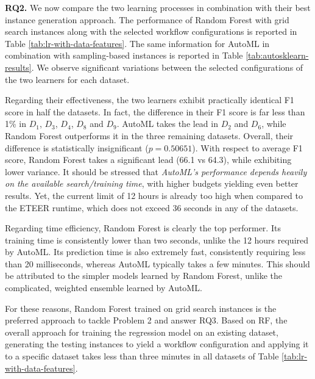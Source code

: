 %



%



\textbf{RQ2.} We now compare the two learning processes in combination with their best instance generation approach. The performance of Random Forest with grid search instances along with the selected workflow configurations 
is reported in Table \ref{tab:lr-with-data-features}. The same information for AutoML in combination with sampling-based instances is reported in Table \ref{tab:autosklearn-results}. We observe significant variations between the selected configurations of the two learners for each dataset.

Regarding their effectiveness, the two learners exhibit practically identical F1 score in half the datasets. In fact, the difference in their F1 score is far less than 1\% in $D_1$, $D_3$, $D_4$, $D_8$ and $D_9$. AutoML takes the lead in $D_2$ and $D_6$, while Random Forest outperforms it in the three remaining datasets. {Overall, their difference is statistically insignificant ($p = 0.50651$).} With respect to average F1 score, Random Forest takes a significant lead (66.1 vs 64.3), while exhibiting lower variance. It should be stressed that \textit{AutoML's performance depends heavily on the available search/training time}, with higher budgets yielding even better results. Yet, the current limit of 12 hours is already too high when compared to the ETEER runtime, which does not exceed 36 seconds in any of the datasets.

Regarding time efficiency, Random Forest is clearly the top performer. Its training time is consistently lower than two seconds, unlike the 12 hours required by AutoML. Its prediction time is also extremely fast, consistently requiring less than 20 milliseconds, whereas AutoML typically takes a few minutes. This should be attributed to the simpler models learned by Random Forest, unlike the complicated, weighted ensemble learned by AutoML. 

For these reasons, Random Forest trained on grid search instances is the preferred approach to tackle Problem 2 and answer RQ3. Based on RF, the overall approach for training the regression model on an existing dataset, generating the testing instances to yield a workflow configuration and applying it to a specific dataset takes less than three minutes in all datasets of Table \ref{tab:lr-with-data-features}. 

